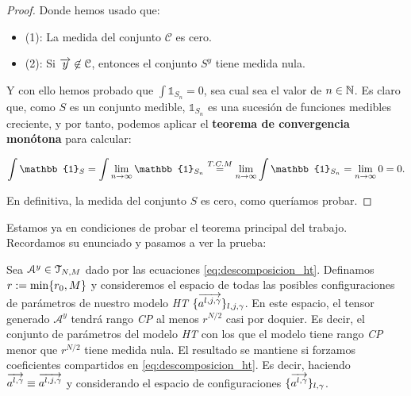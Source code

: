 \begin{proof}
    Donde hemos usado que:

    \begin{itemize}
        \item (1): La medida del conjunto $\mathcal{C}$ es cero.
        \item (2): Si $\overrightarrow{y} \not\in \mathcal{C}$, entonces el conjunto $S^{y}$ tiene medida nula.
    \end{itemize}

    Y con ello hemos probado que $\int \mathbb{1}_{S_n} = 0$, sea cual sea el valor de $n \in \mathbb{N}$. Es claro que, como $S$ es un conjunto medible, $\mathbb{1}_{S_n}$ es una sucesión de funciones medibles creciente, y por tanto, podemos aplicar el \textbf{teorema de convergencia monótona} para calcular:

    \begin{equation}
        \int \mathbb{1}_S = \int \lim_{n \to \infty} \mathbb{1}_{S_n} \encima{=}{T.C.M} \lim_{n \to \infty} \int \mathbb{1}_{S_n} = \lim_{n \to \infty} 0 = 0.
    \end{equation}

    En definitiva, la medida del conjunto $S$ es cero, como queríamos probar.

\end{proof}

Estamos ya en condiciones de probar el teorema principal del trabajo. Recordamos su enunciado y pasamos a ver la prueba:


\begin{teorema} \label{teorema:teorema_principal_especificacion}
    Sea $\mathcal{A}^y \in \mathcal{T}_{N, M}$ dado por las ecuaciones \eqref{eq:descomposicion_ht}. Definamos $r := \min \{ r_0, M \}$ y consideremos el espacio de todas las posibles configuraciones de parámetros de nuestro modelo \textit{HT} $\{  \overrightarrow{a^{l, j, \gamma}} \}_{l, j, \gamma}$. En este espacio, el tensor generado $\mathcal{A}^y$ tendrá rango \textit{CP} al menos $r^{N/2}$ casi por doquier. Es decir, el conjunto de parámetros del modelo \textit{HT} con los que el modelo tiene rango \textit{CP} menor que $r^{N/2}$ tiene medida nula. El resultado se mantiene si forzamos coeficientes compartidos en \eqref{eq:descomposicion_ht}. Es decir, haciendo $\overrightarrow{a^{l, \gamma}} \equiv \overrightarrow{a^{l, j, \gamma}}$ y considerando el espacio de configuraciones $\{ \overrightarrow{a^{l, \gamma}}  \}_{l, \gamma}$.
\end{teorema}

